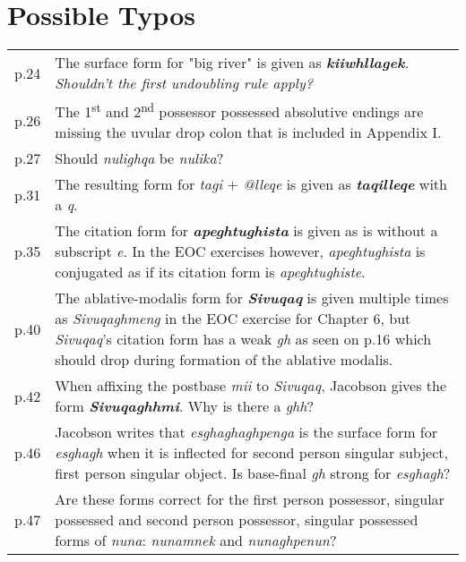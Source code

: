 \documentclass{article}
\begin{document}
\section{Possible Typos}

\begin{tabular}{p{1cm}p{10.5cm}}
p.24 & The surface form for "big river" is given as \textit{\textbf{kiiwhllagek}. Shouldn't the first undoubling rule apply?} \\

p.26 & The 1\textsuperscript{st} and 2\textsuperscript{nd} possessor possessed absolutive endings are missing the uvular drop colon that is included in Appendix I. \\

p.27 & Should \textit{nulighqa} be \textit{nulika}? \\

p.31 & The resulting form for \textit{tagi} + \textit{@lleqe} is given as \textit{\textbf{taqilleqe}} with a \textit{q}. \\

p.35 & The citation form for \textit{\textbf{apeghtughista}} is given as is without a subscript \textit{e}. In the EOC exercises however, \textit{apeghtughista} is conjugated as if its citation form is \textit{apeghtughiste}. \\

p.40 & The ablative-modalis form for \textit{\textbf{Sivuqaq}} is given multiple times as \textit{Sivuqaghmeng} in the EOC exercise for Chapter 6, but \textit{Sivuqaq}'s citation form has a weak \textit{gh} as seen on p.16 which should drop during formation of the ablative modalis.\\

p.42 & When affixing the postbase \textit{mii} to \textit{Sivuqaq}, Jacobson gives the form \textit{\textbf{Sivuqaghhmi}}.
%
Why is there a \textit{ghh}? \\

p.46 & Jacobson writes that \textit{esghaghaghpenga} is the surface form for \textit{esghagh} when it is inflected for second person singular subject, first person singular object.
%
Is base-final \textit{gh} strong for \textit{esghagh}? \\

p.47 & Are these forms correct for the first person possessor, singular possessed and second person possessor, singular possessed forms of \textit{nuna}: \textit{nunamnek} and \textit{nunaghpenun}? \\


\end{tabular}
\end{document}
